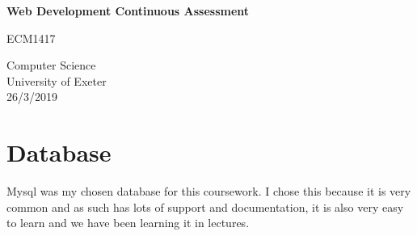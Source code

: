 \documentclass[10pt,a4paper]{report}
\begin{document}
	\begin{titlepage}
		\begin{center}
			\vspace*{1cm}
			
			\textbf{Web Development Continuous Assessment}
			
			\vspace{0.5cm}
			ECM1417
			
			\vspace{1.5cm}
			
			
			\vfill
		
			
			\vspace{0.8cm}
			
			Computer Science\\
			University of Exeter\\
			26/3/2019
			
		\end{center}
	\end{titlepage}

	\newpage
	
	\section{Database}
	Mysql was my chosen database for this coursework. I chose this because it is very common and as such has lots of support and documentation, it is also very easy to learn and we have been learning it in lectures.
\end{document}
